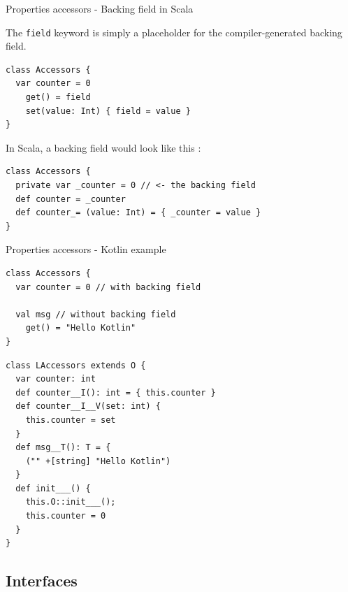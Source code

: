 \documentclass[10pt,usenames,dvipsnames]{beamer}
\newcommand{\inlinecode}[2]{\colorbox{minted-bg}{\lstinline[language=#1]$#2$}}
\newcommand{\ktinline}[1]{\inlinecode{kotlin}{#1}}
\begin{document}
\begin{frame}[fragile]{Properties accessors - Backing field in Scala}

  The \ktinline{field} keyword is simply a placeholder for the compiler-generated backing field.
  
  \begin{verbatim}
class Accessors {
  var counter = 0
    get() = field
    set(value: Int) { field = value }
}
  \end{verbatim}
  
  In Scala, a backing field would look like this : 
  
  \begin{verbatim}
class Accessors {
  private var _counter = 0 // <- the backing field
  def counter = _counter
  def counter_= (value: Int) = { _counter = value }
}
  \end{verbatim}

\end{frame}

\begin{frame}[fragile]{Properties accessors - Kotlin example}

  \begin{verbatim}
class Accessors {
  var counter = 0 // with backing field

  val msg // without backing field
    get() = "Hello Kotlin"
}
  \end{verbatim}
  \begin{verbatim}
class LAccessors extends O {
  var counter: int
  def counter__I(): int = { this.counter }
  def counter__I__V(set: int) {
    this.counter = set
  }
  def msg__T(): T = {
    ("" +[string] "Hello Kotlin")
  }
  def init___() {
    this.O::init___();
    this.counter = 0
  }
}
  \end{verbatim}
\end{frame}


\subsection{Interfaces}

\end{document}
